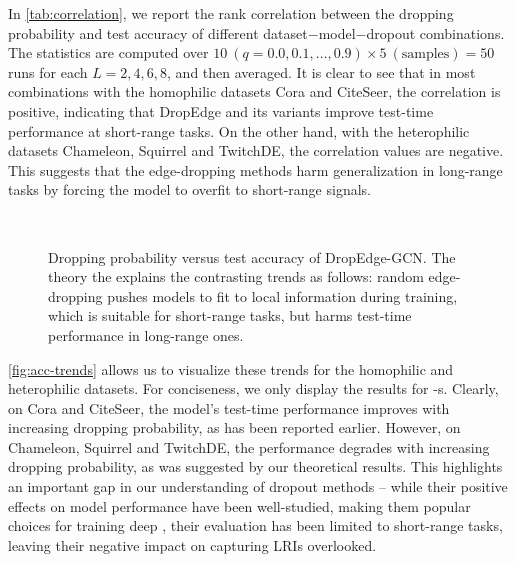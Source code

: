 In \autoref{tab:correlation}, we report the rank correlation between the dropping probability and test accuracy of different dataset$-$model$-$dropout combinations. The statistics are computed over $10\ (q=0.0,0.1,\ldots,0.9) \times 5\ (\text{samples}) = 50$ runs for each $L = 2, 4, 6, 8$, and then averaged. It is clear to see that in most combinations with the homophilic datasets Cora and CiteSeer, the correlation is positive, indicating that DropEdge and its variants improve test-time performance at short-range tasks. On the other hand, with the heterophilic datasets Chameleon, Squirrel and TwitchDE, the correlation values are negative. This suggests that the edge-dropping methods harm generalization in long-range tasks by forcing the model to overfit to short-range signals. %

\begin{figure}[t]
    \centering
     \\
    \vspace{2mm}
    \caption{Dropping probability versus test accuracy of DropEdge-GCN. The theory the explains the contrasting trends as follows: random edge-dropping pushes models to fit to local information during training, which is suitable for short-range tasks, but harms test-time performance in long-range ones.}
    \label{fig:acc-trends}
\end{figure}

\autoref{fig:acc-trends} allows us to visualize these trends for the homophilic and heterophilic datasets. For conciseness, we only display the results for -s. Clearly, on Cora and CiteSeer, the model's test-time performance improves with increasing dropping probability, as has been reported earlier. However, on Chameleon, Squirrel and TwitchDE, the performance degrades with increasing dropping probability, as was suggested by our theoretical results. This highlights an important gap in our understanding of dropout methods -- while their positive effects on model performance have been well-studied, making them popular choices for training deep , their evaluation has been limited to short-range tasks, leaving their negative impact on capturing LRIs overlooked.

